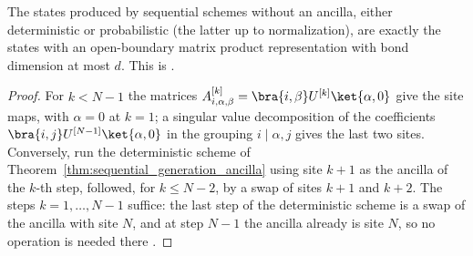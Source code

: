 \begin{theorem}
    \label{thm:sequential_generation_no_ancilla}
    The states produced by sequential schemes without an ancilla, either
    deterministic or probabilistic (the latter up to normalization), are
    exactly the states with an open-boundary matrix product representation
    with bond dimension at most $d$. This is
    \cite[Theorem~14, Section~5.2]{PerezGarcia2007Matrix}.
\end{theorem}
\begin{proof}
    For $k<N-1$ the matrices $A^{[k]}_{i,\alpha,\beta}=\bra{i,\beta}U^{[k]}\ket{\alpha,0}$
    give the site maps, with $\alpha=0$ at $k=1$; a singular value decomposition
    of the coefficients $\bra{i,j}U^{[N-1]}\ket{\alpha,0}$ in the grouping
    $i\mid\alpha,j$ gives the last two sites. Conversely, run the deterministic
    scheme of Theorem~\ref{thm:sequential_generation_ancilla} using site $k+1$
    as the ancilla of the $k$-th step, followed, for $k\le N-2$, by a swap of
    sites $k+1$ and $k+2$. The steps $k=1,\dots,N-1$ suffice: the last step
    of the deterministic scheme is a swap of the ancilla with site $N$, and at
    step $N-1$ the ancilla already is site $N$, so no operation is needed
    there \cite[proof of Theorem~14]{PerezGarcia2007Matrix}.
\end{proof}

